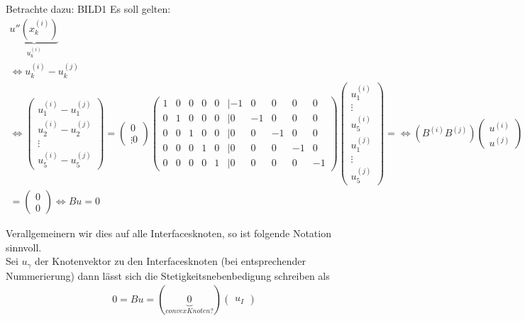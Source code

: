 \begin{enumerate}
Betrachte dazu:
BILD1
Es soll gelten: 
\begin{align}
  \underbrace{u''(x_k^{(i)})}_{u_k^{(i)}} &= \underbrace{u_k^{(j)}}_{u_k^{(j)}} \quad \forall k=1,\cdots ,5\\
  \Leftrightarrow u_k^{(i)} - u_k^{(j)} &= 0 \quad \forall k=1,\cdots ,5\\
  \Leftrightarrow 
  \begin{pmatrix}
    u_1^{(i)}-u_1^{(j)}\\
    u_2^{(i)}-u_2^{(j)}\\
    \vdots\\
    u_5^{(i)}-u_5^{(j)}  
  \end{pmatrix}
  =
  \begin{pmatrix}
    0\\ \vdots 0
  \end{pmatrix}
  \begin{pmatrix}
    1& 0& 0& 0& 0& | -1& 0& 0& 0& 0\\
    0& 1& 0& 0& 0& | 0& -1& 0& 0& 0\\
    0& 0& 1& 0& 0& | 0& 0& -1& 0& 0\\
    0& 0& 0& 1& 0& | 0& 0& 0& -1& 0\\
    0& 0& 0& 0& 1& | 0& 0& 0& 0& -1
  \end{pmatrix}
  \begin{pmatrix}
    u^{(i)}_1\\
    \vdots\\
    u^{(i)}_5\\
    u^{(j)}_1\\
    \vdots\\
    u^{(j)}_5
  \end{pmatrix}
  = 
  \Leftrightarrow
  (B^{(i)} B^{(j)}) %
  \begin{pmatrix}
    u^{(i)}\\
    u^{(j)}
  \end{pmatrix}\\
  =
  \begin{pmatrix}
    0\\
    0
  \end{pmatrix}
  \Leftrightarrow 
  Bu=0
\end{align}

Verallgemeinern wir dies auf alle Interfacesknoten, so ist folgende Notation sinnvoll. \\
Sei $u_\gamma$ der Knotenvektor zu den Interfacesknoten (bei entsprechender Nummerierung) dann lässt sich die Stetigkeitsnebenbedigung schreiben als 
\begin{align}
  0 = Bu = (\underbrace{0}_{convex Knoten?})
  \begin{pmatrix}
    u_I 
  \end{pmatrix}
  \label{}
\end{align}


\end{enumerate}
